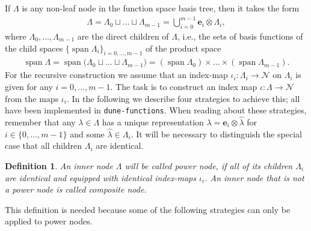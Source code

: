 \documentclass[a4paper,10pt,headings=normal,bibliography=totoc]{scrartcl}
\newtheorem{definition}{Definition}
\newcommand{\dunemodule}[1]{\texttt{#1}}
\begin{document}
If $\Lambda$ is any non-leaf node in the function space basis tree,
then it takes the form
\begin{align*}
  \Lambda = \Lambda_0 \sqcup \dots \sqcup \Lambda_{m-1}
          = \bigcup_{i=0}^{m-1} \mathbf{e}_i \otimes \Lambda_i,
\end{align*}
where $\Lambda_0, \dots,\Lambda_{m-1}$ are the direct children of $\Lambda$,
i.e., the sets of basis functions of the child
spaces $\{\operatorname{span} \Lambda_i\}_{i=0,\dots,m-1}$ of the product space
\begin{align*}
  \operatorname{span} \Lambda
    = \operatorname{span} \bigl( \Lambda_0 \sqcup \dots \sqcup \Lambda_{m-1} \bigr)
    = (\operatorname{span} \Lambda_0) \times \dots \times (\operatorname{span} \Lambda_{m-1}).
\end{align*}
For the recursive construction we assume that an index-map
$\iota_i : \Lambda_i \to \mathcal{N}$ on $\Lambda_i$ is given for any $i=0,\dots,m-1$.
The task is to construct an index map $\iota: \Lambda \to \mathcal{N}$
from the maps $\iota_i$.
In the following we describe four strategies to achieve this; all
have been implemented in \dunemodule{dune-functions}. When reading about these
strategies, remember that any $\lambda \in \Lambda$ has a unique representation
$\lambda = \mathbf{e}_i \otimes \hat{\lambda}$ for $i \in \{0,\dots,m-1\}$ and some
$\hat{\lambda} \in \Lambda_i$.
It will be necessary to distinguish the special case that all children
$\Lambda_i$ are identical.
%
\begin{definition}
\label{def:power_node}
  An inner node $\Lambda$ will be called \emph{power node}, if all of its children $\Lambda_i$
  are identical and equipped with identical index-maps $\iota_i$.
  An inner node that is not a power node is called \emph{composite node}.
\end{definition}
%
This definition is needed because some of the following strategies can only be applied
to power nodes.
\end{document}
